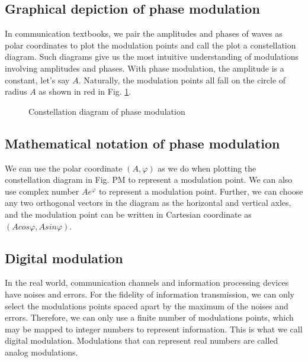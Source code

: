 \documentclass[Letter,11pt]{book}
\begin{document}
\subsection{Graphical depiction of phase modulation}
In communication textbooks, we pair the amplitudes and phases of waves as polar coordinates to plot the modulation points and call the plot a constellation diagram. Such diagrams give us the most intuitive understanding of modulations involving amplitudes and phases. With phase modulation, the amplitude is a constant, let's say $A$. Naturally, the modulation points all fall on the circle of radius $A$ as shown in red in Fig. \ref{PM}.

\begin{figure}[ht]
\caption{Constellation diagram of phase modulation}
\label{PM}
\end{figure}

\subsection{Mathematical notation of phase modulation}
We can use the polar coordinate $(A, \varphi)$ as we do when plotting the constellation diagram in Fig. {PM} to represent a modulation point. We can also use complex number $A e^\varphi$ to represent a modulation point. Further, we can choose any two orthogonal vectors in the diagram as the horizontal and vertical axles, and the modulation point can be written in Cartesian coordinate as $(A cos\varphi, A sin\varphi)$.

\subsection{Digital modulation}
In the real world, communication channels and information processing devices have noises and errors. For the fidelity of information transmission, we can only select the modulations points spaced apart by the maximum of the noises and errors. Therefore, we can only use a finite number of modulations points, which may be mapped to integer numbers to represent information. This is what we call digital modulation. Modulations that can represent real numbers are called analog modulations.
\end{document}
